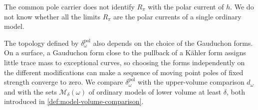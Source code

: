 The common pole carrier does not identify $R_\pi$ with the polar current of $h$. We do not know whether all the limits $R_\pi$ are the polar currents of a single ordinary model.

The topology defined by $\delta^{\mathrm{pol}}_\omega$ also depends on the choice of the Gauduchon forms. On a surface, a Gauduchon form close to the pullback of a K\"ahler form assigns little trace mass to exceptional curves, so choosing the forms independently on the different modifications can make a sequence of moving point poles of fixed strength converge to zero. We compare $\delta^{\mathrm{pol}}_\omega$ with the upper-volume comparison $d_\omega$ and with the sets $\mathcal M_\delta(\omega)$ of ordinary models of lower volume at least $\delta$, both introduced in \cref{def:model-volume-comparison}.

